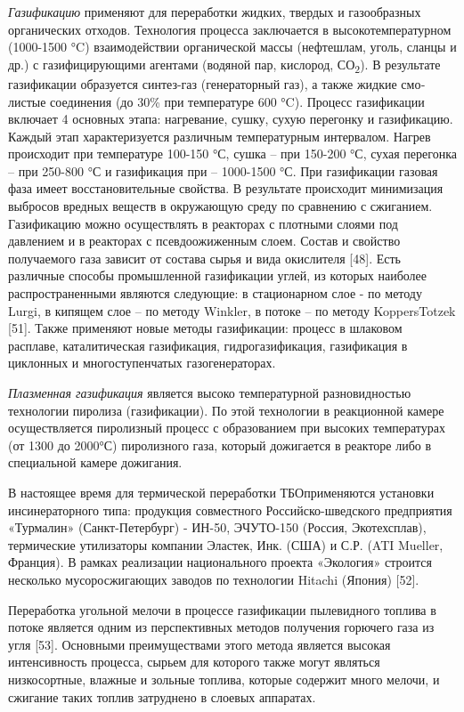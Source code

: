 \begin{multicols}{2}
\emph{Газификацию} применяют для переработки жидких, твердых и
газообразных органических отходов. Технология процесса заключается в
высокотемператур­ном (1000-1500 °C) взаимодействии органической массы
(нефтешлам, уголь, сланцы и др.) с газифицирующими агентами (водяной
пар, кислород, СО\textsubscript{2}). В результате газификации образуется
синтез-газ (генера­торный газ), а также жидкие смо­листые соединения (до
30\% при температуре 600 °C). Процесс газификации включает 4 основных
этапа: нагревание, сушку, сухую перегонку и газифика­цию. Каждый этап
характеризуется различным температурным интервалом. Нагрев происходит
при темпе­ратуре 100-150 °С, сушка -- при 150-200 °С, сухая пере­гонка --
при 250-800 °С и газификация при -- 1000-1500 °С. При газификации
газовая фаза имеет восстановительные свойства. В результате происходит
минимизация выбросов вредных веществ в окружающую среду по сравнению с
сжиганием. Газификацию можно осуществлять в реакторах с плотными слоями
под давлением и в реакторах с псев­доожиженным слоем. Состав и свойство
получаемого газа зависит от состава сырья и вида окислителя {[}48{]}.
Есть различные способы промышленной газификации углей, из которых
наиболее распространенными являются следующие: в стационарном слое - по
методу Lurgi, в кипящем слое -- по методу Winkler, в потоке -- по методу
KoppersTotzek {[}51{]}. Также применяют новые методы газификации:
процесс в шлаковом расплаве, каталитическая газификация,
гидрогазификация, газификация в циклонных и многоступенчатых
газогенераторах.

\emph{Плазменная газификация} является высоко температурной
разновидностью технологии пиролиза (газификации). По этой технологии в
реакционной камере осуществляется пиролизный процесс с образованием при
высоких температурах (от 1300 до 2000°С) пиролизного газа, который
дожигается в реакторе либо в специальной камере дожигания.

В настоящее время для термической переработки ТБОприменяются установки
инсинераторного типа: продукция совместного Российско-шведского
предприятия «Турмалин» (Санкт-Петербург) - ИН-50, ЭЧУТО-150 (Россия,
Экотехсплав), термические утилизаторы компании Эластек, Инк. (США) и
С.Р. (ATI Mueller, Франция). В рамках реализации национального проекта
«Экология» строится несколько мусоросжигающих заводов по технологии
Hitachi (Япония) {[}52{]}.

Переработка угольной мелочи в процессе газификации пылевидного топлива в
потоке является одним из перспективных методов получения горючего газа
из угля {[}53{]}. Основными преимуществами этого метода является высокая
интенсивность процесса, сырьем для которого также могут являться
низкосортные, влажные и зольные топлива, которые содержит много мелочи,
и сжигание таких топлив затруднено в слоевых аппаратах.


\end{multicols}
